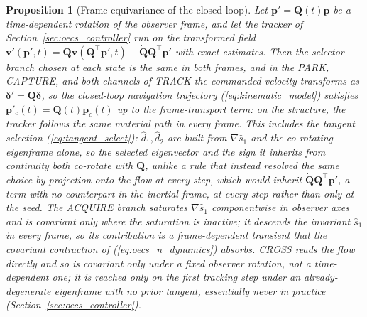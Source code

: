 \documentclass[lettersize,journal]{IEEEtran}
\newtheorem{proposition}{Proposition}
\begin{document}
\begin{proposition}[Frame equivariance of the closed loop]
\label{prop:equivariance}
Let $\mathbf{p}'= \mathbf{Q}(t)\mathbf{p}$ be a time-dependent rotation
of the observer frame, and let the tracker of
Section~\ref{sec:oecs_controller} run on the transformed field
$\mathbf{v}'(\mathbf{p}', t) = \mathbf{Q}\mathbf{v}(\mathbf{Q}^\top
\mathbf{p}', t) + \dot{\mathbf{Q}}\mathbf{Q}^\top\mathbf{p}'$ with
exact estimates. Then the selector branch chosen at each state is the
same in both frames, and in the PARK, CAPTURE, and both channels of
TRACK the commanded velocity transforms as
$\boldsymbol{\delta}' = \mathbf{Q}\boldsymbol{\delta}$, so the
closed-loop navigation trajectory (\ref{eq:kinematic_model}) satisfies
$\mathbf{p}'_c(t) = \mathbf{Q}(t)\mathbf{p}_c(t)$ up to the
frame-transport term: on the structure, the tracker follows the same
material path in every frame. This includes the tangent selection
(\ref{eq:tangent_select}): $\hat{d}_1, \hat{d}_2$ are built from
$\nabla\hat{s}_1$ and the co-rotating eigenframe alone, so the
selected eigenvector and the sign it inherits from continuity both
co-rotate with $\mathbf{Q}$, unlike a rule that instead resolved the
same choice by projection onto the flow at every step, which would
inherit $\dot{\mathbf{Q}}\mathbf{Q}^\top\mathbf{p}'$, a term with no
counterpart in the inertial frame, at every step rather than only at
the seed. The ACQUIRE branch saturates $\nabla\hat{s}_1$ componentwise
in observer axes and is covariant only where the saturation is
inactive; it descends the invariant $\hat{s}_1$ in every frame, so its
contribution is a frame-dependent transient that the covariant
contraction of (\ref{eq:oecs_n_dynamics}) absorbs. CROSS reads the
flow directly and so is covariant only under a fixed observer
rotation, not a time-dependent one; it is reached only on the first
tracking step under an already-degenerate eigenframe with no prior
tangent, essentially never in practice
(Section~\ref{sec:oecs_controller}).
\end{proposition}
\end{document}
